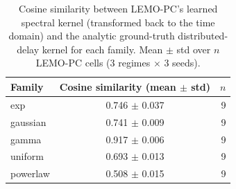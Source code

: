 \begin{table}[h]
\centering
\caption{Cosine similarity between LEMO-PC's learned spectral kernel
(transformed back to the time domain) and the analytic ground-truth
distributed-delay kernel for each family.  Mean $\pm$ std over $n$
LEMO-PC cells (3 regimes $\times$ 3 seeds).}
\label{tab:kernel-recovery-cosine}
\begin{tabular}{lcr}
\toprule
Family & Cosine similarity (mean $\pm$ std) & $n$ \\
\midrule
exp & 0.746 $\pm$ 0.037 & 9 \\
gaussian & 0.741 $\pm$ 0.009 & 9 \\
gamma & 0.917 $\pm$ 0.006 & 9 \\
uniform & 0.693 $\pm$ 0.013 & 9 \\
powerlaw & 0.508 $\pm$ 0.015 & 9 \\
\bottomrule
\end{tabular}
\end{table}
